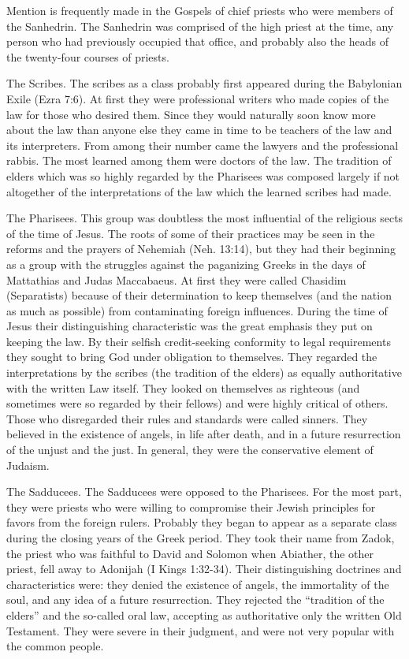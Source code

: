 Mention is frequently made in the Gospels of chief priests who were members of the Sanhedrin. The Sanhedrin was comprised of the high priest at the time, any person who had previously occupied that office, and probably also the heads of the twenty-four courses of priests.

The Scribes. The scribes as a class probably first appeared during the Babylonian Exile (Ezra 7:6). At first they were professional writers who made copies of the law for those who desired them. Since they would naturally soon know more about the law than anyone else they came in time to be teachers of the law and its interpreters. From among their number came the lawyers and the professional rabbis. The most learned among them were doctors of the law. The tradition of elders which was so highly regarded by the Pharisees was composed largely if not altogether of the interpretations of the law which the learned scribes had made.

The Pharisees. This group was doubtless the most influential of the religious sects of the time of Jesus. The roots of some of their practices may be seen in the reforms and the prayers of Nehemiah (Neh. 13:14), but they had their beginning as a group with the struggles against the paganizing Greeks in the days of Mattathias and Judas Maccabaeus. At first they were called Chasidim (Separatists) because of their determination to keep themselves (and the nation as much as possible) from contaminating foreign influences. During the time of Jesus their distinguishing characteristic was the great emphasis they put on keeping the law. By their selfish credit-seeking conformity to legal requirements they sought to bring God under obligation to themselves. They regarded the interpretations by the scribes (the tradition of the elders) as equally authoritative with the written Law itself. They looked on themselves as righteous (and sometimes were so regarded by their fellows) and were highly critical of others. Those who disregarded their rules and standards were called sinners. They believed in the existence of angels, in life after death, and in a future resurrection of the unjust and the just. In general, they were the conservative element of Judaism.

The Sadducees. The Sadducees were opposed to the Pharisees. For the most part, they were priests who were willing to compromise their Jewish principles for favors from the foreign rulers. Probably they began to appear as a separate class during the closing years of the Greek period. They took their name from Zadok, the priest who was faithful to David and Solomon when Abiather, the other priest, fell away to Adonijah (I Kings 1:32-34). Their distinguishing doctrines and characteristics were: they denied the existence of angels, the immortality of the soul, and any idea of a future resurrection. They rejected the ``tradition of the elders'' and the so-called oral law, accepting as authoritative only the written Old Testament. They were severe in their judgment, and were not very popular with the common people.

